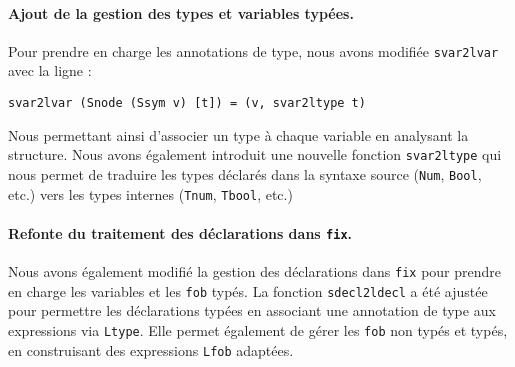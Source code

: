 \documentclass{article}
\begin{document}
\paragraph{Ajout de la gestion des types et variables typées.}
Pour prendre en charge les annotations de type, nous avons modifiée \texttt{svar2lvar} avec la ligne :
\begin{verbatim}
svar2lvar (Snode (Ssym v) [t]) = (v, svar2ltype t)
\end{verbatim}
Nous permettant ainsi d'associer un type à chaque variable en analysant la structure. Nous avons également introduit une nouvelle fonction \texttt{svar2ltype} qui nous permet de traduire les types déclarés dans la syntaxe source (\texttt{Num}, \texttt{Bool}, etc.) vers les types internes (\texttt{Tnum}, \texttt{Tbool}, etc.)


\paragraph{Refonte du traitement des déclarations dans \texttt{fix}.}
    \begin{justify}
    Nous avons également modifié la gestion des déclarations dans \texttt{fix} pour prendre en charge les variables et les \texttt{fob} typés. La fonction \texttt{sdecl2ldecl} a été ajustée pour permettre les déclarations typées en associant une annotation de type aux expressions via \texttt{Ltype}. Elle permet également de gérer les \texttt{fob} non typés et typés, en construisant des expressions \texttt{Lfob} adaptées.
    \end{justify}
\end{document}
